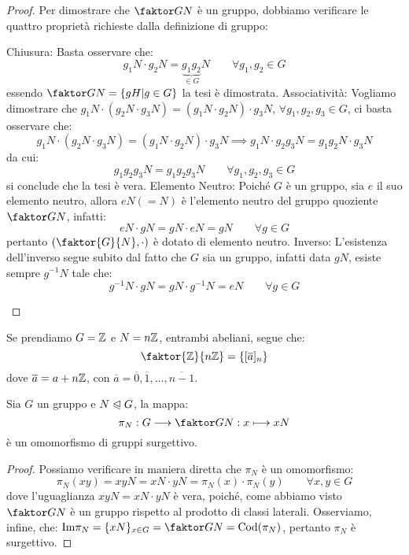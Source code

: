 \documentclass[11pt]{scrartcl}
\begin{document}
\begin{proof}
Per dimostrare che $\faktor GN$ è un gruppo, dobbiamo verificare le quattro proprietà richieste dalla definizione di gruppo:
	\begin{enumerate}[(a)]
	\ii Chiusura: Basta osservare che:
		\[ g_1N \cdot g_2N = \underbrace{g_1g_2}_{\in G}N
		\qquad \forall g_1,g_2 \in G
		\]
essendo $\faktor GN = \{gH | g \in G\}$ la tesi è dimostrata.
	\ii Associatività: Vogliamo dimostrare che $g_1N \cdot (g_2N \cdot g_3N) = (g_1N \cdot g_2N) \cdot g_3N$, $\forall g_1,g_2,g_3 \in G$, ci basta osservare che:
		\[ g_1N \cdot (g_2N \cdot g_3N) = (g_1N \cdot g_2N) \cdot g_3N \implies  g_1N \cdot g_2g_3N =  g_1g_2N \cdot g_3N 
		\]
da cui:
	\[ g_1g_2g_3N =g_1g_2g_3N
	\qquad
	\forall g_1,g_2,g_3 \in G
	\]
si conclude che la tesi è vera.
	\ii Elemento Neutro: Poiché $G$ è un gruppo, sia $e$ il suo elemento neutro, allora $eN (= N)$ è l'elemento neutro del gruppo quoziente $\faktor GN$, infatti:
		\[ eN \cdot gN = gN \cdot eN = gN
		\qquad
		\forall g \in G
		\]
pertanto $\left(\faktor{G}{N}, \cdot \right)$ è dotato di elemento neutro.
	\ii Inverso: L'esistenza dell'inverso segue subito dal fatto che $G$ sia un gruppo, infatti data $gN$, esiste sempre $g^{-1}N$ tale che:
		\[ g^{-1}N \cdot gN = gN \cdot g^{-1}N = eN
		\qquad
		\forall g \in G
		\]
	\end{enumerate}
\end{proof}

\begin{example}
[$\Zn$]
Se prendiamo $G=\mathbb Z$ e $N=n\mathbb Z$, entrambi abeliani, segue che:
	\[ \faktor{\ZZ}{n\ZZ}= \left\{[\overline{a}]_n\right\}
	\]
dove $\overline{a} = a +n\mathbb Z$, con $\overline{a}=\overline{0},\overline{1},\ldots,\overline{n-1}$.
\end{example}

\begin{theorem}
Sia $G$ un gruppo e $N \trianglelefteqslant G$, la mappa:
	\[ \pi_N : G \longrightarrow \faktor GN : x \longmapsto xN
	\]
è un omomorfismo di gruppi surgettivo.
\end{theorem}

\begin{proof}
Possiamo verificare in maniera diretta che $\pi_N$ è un omomorfismo:
	\[ \pi_N(xy)=xyN=xN \cdot yN=\pi_N(x) \cdot \pi_N(y)
	\qquad
	\forall x,y \in G
	\]
dove l'uguaglianza $xyN=xN \cdot yN$ è vera, poiché, come abbiamo visto $\faktor GN$ è un gruppo rispetto al prodotto di classi laterali. Osserviamo, infine, che: $\text{Im} \pi_N=\{xN\}_{x \in G}=\faktor GN = \text{Cod}(\pi_N)$, pertanto $\pi_N$ è surgettivo.
\end{proof}
\end{document}
